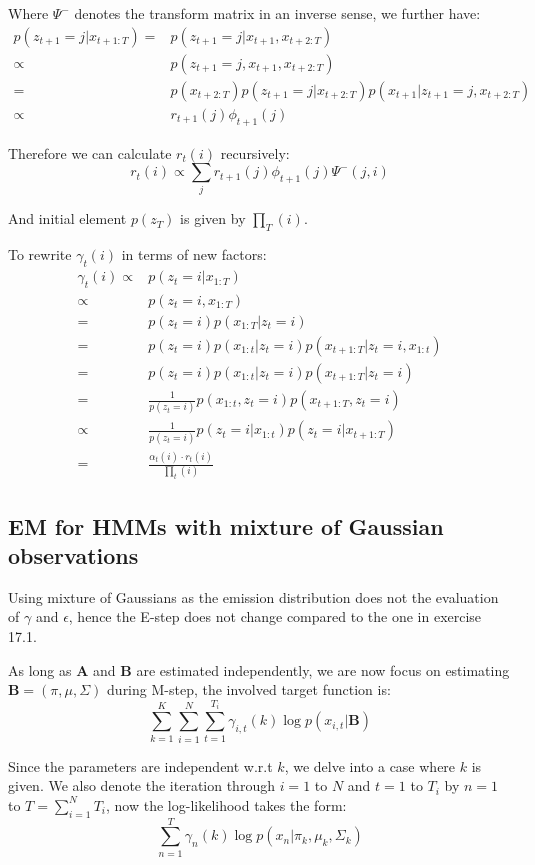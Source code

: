 \documentclass[UTF8]{ctexart}
\begin{document}
Where $\Psi^{-}$ denotes the transform matrix in an inverse sense, we further have:
\begin{align}
p(z_{t+1}=j|x_{t+1:T})=&p(z_{t+1}=j|x_{t+1},x_{t+2:T}) \nonumber \\
\propto&p(z_{t+1}=j,x_{t+1},x_{t+2:T}) \nonumber \\
=&p(x_{t+2:T})p(z_{t+1}=j|x_{t+2:T})p(x_{t+1}|z_{t+1}=j,x_{t+2:T}) \nonumber \\
\propto& r_{t+1}(j)\phi_{t+1}(j) \nonumber
\end{align}

Therefore we can calculate $r_{t}(i)$ recursively:
$$r_{t}(i)\propto \sum_{j}r_{t+1}(j)\phi_{t+1}(j)\Psi^{-}(j,i)$$

And initial element $p(z_{T})$ is given by $\prod_{T}(i)$.

To rewrite $\gamma_{t}(i)$ in terms of new factors:
\begin{align}
\gamma_{t}(i)\propto&p(z_{t}=i|x_{1:T})\nonumber \\
\propto& p(z_{t}=i,x_{1:T}) \nonumber \\
=&p(z_{t}=i)p(x_{1:T}|z_{t}=i)\nonumber \\
=&p(z_{t}=i)p(x_{1:t}|z_{t}=i)p(x_{t+1:T}|z_{t}=i,x_{1:t}) \nonumber \\
=&p(z_{t}=i)p(x_{1:t}|z_{t}=i)p(x_{t+1:T}|z_{t}=i) \nonumber \\
=&\frac{1}{p(z_{t}=i)}p(x_{1:t},z_{t}=i)p(x_{t+1:T},z_{t}=i) \nonumber \\
\propto&\frac{1}{p(z_{t}=i)}p(z_{t}=i|x_{1:t})p(z_{t}=i|x_{t+1:T}) \nonumber \\
=&\frac{\alpha_{t}(i)\cdot r_{t}(i)}{\prod_{t}(i)} \nonumber
\end{align}

\subsection{EM for HMMs with mixture of Gaussian observations}
Using mixture of Gaussians as the emission distribution does not the evaluation of $\gamma$ and $\epsilon$, hence the E-step does not change compared to the one in exercise 17.1.

As long as $\textbf{A}$ and $\textbf{B}$ are estimated independently, we are now focus on estimating $\textbf{B}=(\pi,\mu,\Sigma)$ during M-step, the involved target function is:
$$\sum_{k=1}^{K}\sum_{i=1}^{N}\sum_{t=1}^{T_{i}}\gamma_{i,t}(k)\log p(x_{i,t}|\textbf{B})$$

Since the parameters are independent w.r.t $k$, we delve into a case where $k$ is given. We also denote the iteration through $i=1$ to $N$ and $t=1$ to $T_{i}$ by $n=1$ to $T=\sum_{i=1}^{N}T_{i}$, now the log-likelihood takes the form:
$$\sum_{n=1}^{T}\gamma_{n}(k)\log p(x_{n}|\pi_{k},\mu_{k},\Sigma_{k})$$
\end{document}

